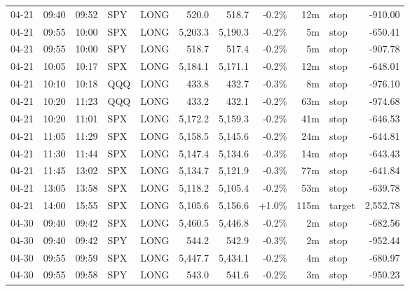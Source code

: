 \documentclass[11pt,a4paper,twoside]{article}
\begin{document}
\begin{center}
\begin{longtable}{>{\color{txtmain}}l l l l l r r r r >{\color{txtmain}}l r}
04-21 & 09:40 & 09:52 & SPY & LONG & 520.0 & 518.7 & \textcolor{lossred}{-0.2\%} & 12m & stop & \textcolor{lossred}{-910.00} \\
04-21 & 09:55 & 10:00 & SPX & LONG & 5,203.3 & 5,190.3 & \textcolor{lossred}{-0.2\%} & 5m & stop & \textcolor{lossred}{-650.41} \\
04-21 & 09:55 & 10:00 & SPY & LONG & 518.7 & 517.4 & \textcolor{lossred}{-0.2\%} & 5m & stop & \textcolor{lossred}{-907.78} \\
04-21 & 10:05 & 10:17 & SPX & LONG & 5,184.1 & 5,171.1 & \textcolor{lossred}{-0.2\%} & 12m & stop & \textcolor{lossred}{-648.01} \\
04-21 & 10:10 & 10:18 & QQQ & LONG & 433.8 & 432.7 & \textcolor{lossred}{-0.3\%} & 8m & stop & \textcolor{lossred}{-976.10} \\
04-21 & 10:20 & 11:23 & QQQ & LONG & 433.2 & 432.1 & \textcolor{lossred}{-0.2\%} & 63m & stop & \textcolor{lossred}{-974.68} \\
04-21 & 10:20 & 11:01 & SPX & LONG & 5,172.2 & 5,159.3 & \textcolor{lossred}{-0.2\%} & 41m & stop & \textcolor{lossred}{-646.53} \\
04-21 & 11:05 & 11:29 & SPX & LONG & 5,158.5 & 5,145.6 & \textcolor{lossred}{-0.2\%} & 24m & stop & \textcolor{lossred}{-644.81} \\
04-21 & 11:30 & 11:44 & SPX & LONG & 5,147.4 & 5,134.6 & \textcolor{lossred}{-0.3\%} & 14m & stop & \textcolor{lossred}{-643.43} \\
04-21 & 11:45 & 13:02 & SPX & LONG & 5,134.7 & 5,121.9 & \textcolor{lossred}{-0.3\%} & 77m & stop & \textcolor{lossred}{-641.84} \\
04-21 & 13:05 & 13:58 & SPX & LONG & 5,118.2 & 5,105.4 & \textcolor{lossred}{-0.2\%} & 53m & stop & \textcolor{lossred}{-639.78} \\
04-21 & 14:00 & 15:55 & SPX & LONG & 5,105.6 & 5,156.6 & \textcolor{wingreen}{+1.0\%} & 115m & target & \textcolor{wingreen}{2,552.78} \\
04-30 & 09:40 & 09:42 & SPX & LONG & 5,460.5 & 5,446.8 & \textcolor{lossred}{-0.2\%} & 2m & stop & \textcolor{lossred}{-682.56} \\
04-30 & 09:40 & 09:42 & SPY & LONG & 544.2 & 542.9 & \textcolor{lossred}{-0.3\%} & 2m & stop & \textcolor{lossred}{-952.44} \\
04-30 & 09:55 & 09:59 & SPX & LONG & 5,447.7 & 5,434.1 & \textcolor{lossred}{-0.2\%} & 4m & stop & \textcolor{lossred}{-680.97} \\
04-30 & 09:55 & 09:58 & SPY & LONG & 543.0 & 541.6 & \textcolor{lossred}{-0.2\%} & 3m & stop & \textcolor{lossred}{-950.23} \\
\end{longtable}
\end{center}
\clearpage
\end{document}
